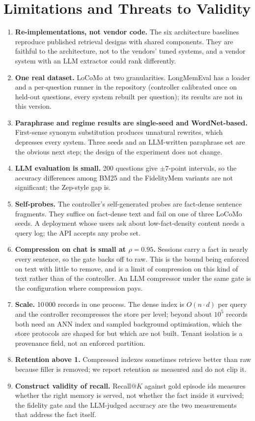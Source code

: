 \documentclass[journal]{IEEEtran}
\begin{document}
\section{Limitations and Threats to Validity}
\begin{enumerate}
\item \textbf{Re-implementations, not vendor code.} The six architecture baselines reproduce published retrieval designs with shared components. They are faithful to the architecture, not to the vendors' tuned systems, and a vendor system with an LLM extractor could rank differently.
\item \textbf{One real dataset.} LoCoMo at two granularities. LongMemEval has a loader and a per-question runner in the repository (controller calibrated once on held-out questions, every system rebuilt per question); its results are not in this version.
\item \textbf{Paraphrase and regime results are single-seed and WordNet-based.} First-sense synonym substitution produces unnatural rewrites, which depresses every system. Three seeds and an LLM-written paraphrase set are the obvious next step; the design of the experiment does not change.
\item \textbf{LLM evaluation is small.} 200 questions give $\pm 7$-point intervals, so the accuracy differences among BM25 and the FidelityMem variants are not significant; the Zep-style gap is.
\item \textbf{Self-probes.} The controller's self-generated probes are fact-dense sentence fragments. They suffice on fact-dense text and fail on one of three LoCoMo seeds. A deployment whose users ask about low-fact-density content needs a query log; the API accepts any probe set.
\item \textbf{Compression on chat is small at $\rho = 0.95$.} Sessions carry a fact in nearly every sentence, so the gate backs off to raw. This is the bound being enforced on text with little to remove, and is a limit of compression on this kind of text rather than of the controller. An LLM compressor under the same gate is the configuration where compression pays.
\item \textbf{Scale.} 10\,000 records in one process. The dense index is $O(n \cdot d)$ per query and the controller recompresses the store per level; beyond about $10^5$ records both need an ANN index and sampled background optimisation, which the store protocols are shaped for but which are not built. Tenant isolation is a provenance field, not an enforced partition.
\item \textbf{Retention above 1.} Compressed indexes sometimes retrieve better than raw because filler is removed; we report retention as measured and do not clip it.
\item \textbf{Construct validity of recall.} Recall@$K$ against gold episode ids measures whether the right memory is served, not whether the fact inside it survived; the fidelity gate and the LLM-judged accuracy are the two measurements that address the fact itself.
\end{enumerate}
\end{document}
